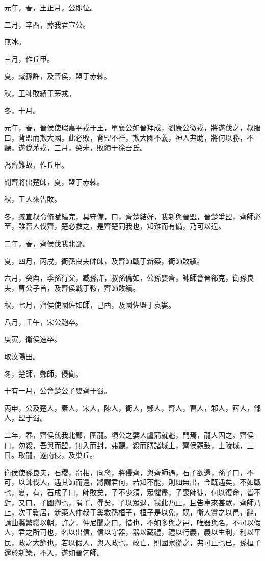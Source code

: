 
\begin{pinyinscope}
元年，春，王正月，公即位。

二月，辛酉，葬我君宣公。

無冰。

三月，作丘甲。

夏，臧孫許，及晉侯，盟于赤棘。

秋，王師敗績于茅戎。

冬，十月。

元年，春，晉侯使瑕嘉平戎于王，單襄公如晉拜成，劉康公徼戎，將遂伐之，叔服曰，背盟而欺大國，此必敗，背盟不祥，欺大國不義，神人弗助，將何以勝，不聽，遂伐茅戎，三月，癸未，敗績于徐吾氏。

為齊難故，作丘甲。

聞齊將出楚師，夏，盟于赤棘。

秋，王人來告敗。

冬，臧宣叔令脩賦繕完，具守備，曰，齊楚結好，我新與晉盟，晉楚爭盟，齊師必至，雖晉人伐齊，楚必救之，是齊楚同我也，知難而有備，乃可以逞。

二年，春，齊侯伐我北鄙。

夏，四月，丙戌，衛孫良夫帥師，及齊師戰于新築，衛師敗績。

六月，癸酉，季孫行父，臧孫許，叔孫僑如，公孫嬰齊，帥師會晉郤克，衛孫良夫，曹公子首，及齊侯戰于鞍，齊師敗績。

秋，七月，齊侯使國佐如師，己酉，及國佐盟于袁婁。

八月，壬午，宋公鮑卒。

庚寅，衛侯速卒。

取汶陽田。

冬，楚師，鄭師，侵衛。

十有一月，公會楚公子嬰齊于蜀。

丙申，公及楚人，秦人，宋人，陳人，衛人，鄭人，齊人，曹人，邾人，薛人，鄫人，盟于蜀。

二年，春，齊侯伐我北鄙，圍龍。頃公之嬖人盧蒲就魁，門焉，龍人囚之。齊侯曰，勿殺，吾與而盟，無入而封，弗聽，殺而膊諸城上，齊侯親鼓，士陵城，三日。取龍，遂南侵，及巢丘。

衛侯使孫良夫，石稷，甯相，向禽，將侵齊，與齊師遇，石子欲還，孫子曰，不可，以師伐人，遇其師而還，將謂君何，若知不能，則如無出，今既遇矣，不如戰也，夏，有，石成子曰，師敗矣，子不少須，眾懼盡，子喪師徒，何以復命，皆不對，又曰，子國卿也，隕子，辱矣，子以眾退，我此乃止，且告車來甚眾，齊師乃止，次于鞫居，新築人仲叔于奚救孫桓子，桓子是以免，既，衛人賞之以邑，辭，請曲縣繁纓以朝，許之，仲尼聞之曰，惜也，不如多與之邑，唯器與名，不可以假人，君之所司也，名以出信，信以守器，器以藏禮，禮以行義，義以生利，利以平民，政之大節也，若以假人，與人政也，政亡，則國家從之，弗可止也已，孫桓子還於新築，不入，遂如晉乞師。


\end{pinyinscope}
